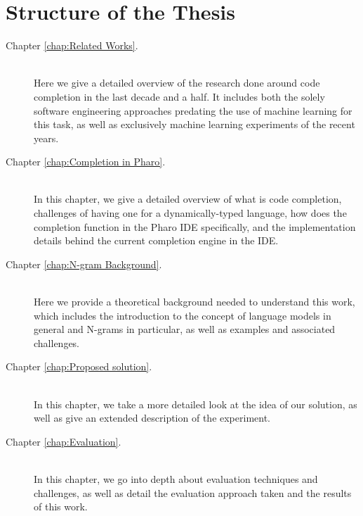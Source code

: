 \section{Structure of the Thesis}
{\hypersetup{linkcolor=black}
\begin{description}
	\item [Chapter \ref{chap:Related Works}. ] \hfill \\
	Here we give a detailed overview of the research done around code completion in the last decade and a half. It includes both the solely software engineering approaches predating the use of machine learning for this task, as well as exclusively machine learning experiments of the recent years.
	\item [Chapter \ref{chap:Completion in Pharo}. ] \hfill \\
	In this chapter, we give a detailed overview of what is code completion, challenges of having one for a dynamically-typed language, how does the completion function in the Pharo IDE specifically, and the implementation details behind the current completion engine in the IDE.
	\item [Chapter \ref{chap:N-gram Background}. ] \hfill \\
    Here we provide a theoretical background needed to understand this work, which includes the introduction to the concept of language models in general and N-grams in particular, as well as examples and associated challenges.
    \item [Chapter \ref{chap:Proposed solution}. ] \hfill \\
	In this chapter, we take a more detailed look at the idea of our solution, as well as give an extended description of the experiment.
	\item [Chapter \ref{chap:Evaluation}. ] \hfill \\
	In this chapter, we go into depth about evaluation techniques and challenges, as well as detail the evaluation approach taken and the results of this work.
\end{description}
}